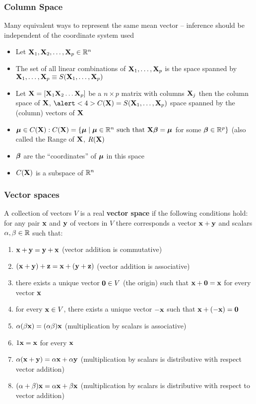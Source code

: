 \documentclass[handout]{beamer}
\begin{document}
\begin{frame}
  \frametitle{Column Space}
Many equivalent ways to represent the same mean vector -- inference
should be independent of the coordinate system used \pause
\begin{itemize}
\item Let $\mathbf{X}_1, \mathbf{X}_2,\ldots, \mathbf{X}_p \in \mathbb{R}^n$  \pause
\item The set of all linear combinations of $\mathbf{X}_1, \ldots, \mathbf{X}_p$ is
  the space spanned by $\mathbf{X}_1, \ldots, \mathbf{X}_p \equiv S(\mathbf{X}_1, \ldots,
  \mathbf{X}_p)$  \pause
\item Let $\mathbf{X} = [ \mathbf{X}_1\mathbf{X}_2 \ldots \mathbf{X}_p]$ be a $n \times p$ matrix with
  columns $\mathbf{X}_j$ then the column space of $\mathbf{X}$, $\alert<4>{C(\X) = S(\X_1, \ldots,
  \X_p)}$ space spanned by the (column) vectors of $\mathbf{X}$ \pause
\item $\boldsymbol{\mu} \in C(\mathbf{X}): C(\mathbf{X}) = \{\boldsymbol{\mu} \mid \boldsymbol{\mu} \in \mathbb{R}^n \text{ such
    that } \mathbf{X} \boldsymbol{\beta} =
    \boldsymbol{\mu} $ for some $\boldsymbol{\beta} \in \mathbb{R}^p\}$  (also called the Range of $\mathbf{X}$,
    $R(\mathbf{X})$ \pause
\item $\boldsymbol{\beta}$ are the ``coordinates'' of $\boldsymbol{\mu}$  in this space \pause
\item $C(\mathbf{X})$ is a subspace of $\mathbb{R}^n$
\end{itemize}
\end{frame}
\begin{frame}
  \frametitle{Vector spaces}
A collection of vectors $V$ is a real {\bf vector
  space} if the following conditions hold: for any pair $\mathbf{x}$ and $\mathbf{y}$
of vectors in $V$ there corresponds a vector $\mathbf{x} + \mathbf{y}$ and scalars
$\alpha, \beta \in \mathbb{R}$ such that: \pause
\begin{small}
\begin{enumerate}
\item $\mathbf{x} + \mathbf{y} = \mathbf{y} + \mathbf{x}$  (vector addition is commutative) \pause
\item $(\mathbf{x} + \mathbf{y}) + \mathbf{z} = \mathbf{x} + (\mathbf{y} + \mathbf{z})$ (vector addition is
  associative) \pause
\item there exists a unique vector $\mathbf{0} \in V$ (the origin) such that $\mathbf{x} + \mathbf{0} =
 \mathbf{x}$ for every vector $\mathbf{x}$ \pause
\item for every $\mathbf{x} \in V$, there exists a unique vector $-\mathbf{x}$ such that $\mathbf{x} + 
(-\mathbf{x}) = \mathbf{0}$ \pause
\item $\alpha (\beta \mathbf{x}) = (\alpha \beta) \mathbf{x} $ (multiplication by
  scalars is associative) \pause
\item $1 \mathbf{x} = \mathbf{x}$ for every $\mathbf{x}$ \pause 
\item $\alpha(\mathbf{x} + \mathbf{y}) = \alpha \mathbf{x} + \alpha \mathbf{y}$ (multiplication by
  scalars is distributive with respect vector addition) \pause
\item $(\alpha + \beta)\mathbf{x} = \alpha \mathbf{x} + \beta \mathbf{x}$ (multiplication by scalars is 
distributive with respect to vector addition)
\end{enumerate}
  
\end{small}

\end{frame}
\end{document}
